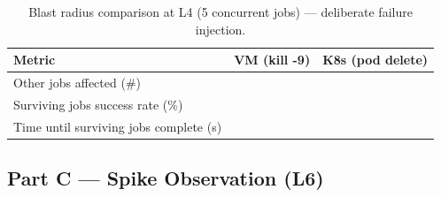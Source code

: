 
\begin{table}[H]
  \centering
  \caption{Blast radius comparison at L4 (5 concurrent jobs) --- deliberate failure injection.}
  \label{tab:blast-radius}
  \small
  \begin{tabular}{lcc}
    \toprule
    \textbf{Metric} & \textbf{VM (kill -9)} & \textbf{K8s (pod delete)} \\
    \midrule
    Other jobs affected (\#) & & \\
    Surviving jobs success rate (\%) & & \\
    Time until surviving jobs complete (s) & & \\
    \bottomrule
  \end{tabular}
\end{table}


\subsection{Part C --- Spike Observation (L6)}
\label{subsec:results-exp2c}

